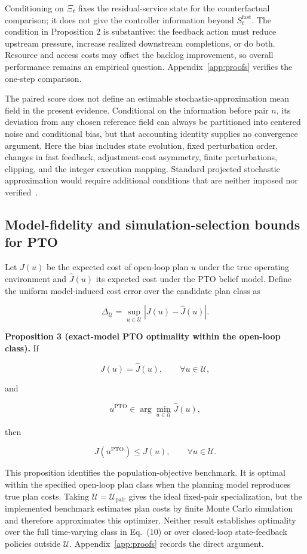 \documentclass[preprint,12pt,authoryear,a4paper]{elsarticle}
\begin{document}
Conditioning on \(\Xi_t\) fixes the residual-service state for the counterfactual comparison; it does not give the controller information beyond \(S_t^{\mathrm{fast}}\). The condition in Proposition 2 is substantive: the feedback action must reduce upstream pressure, increase realized downstream completions, or do both. Resource and access costs may offset the backlog improvement, so overall performance remains an empirical question. Appendix~\ref{app:proofs} verifies the one-step comparison.

The paired score does not define an estimable stochastic-approximation mean field in the present evidence. Conditional on the information before pair \(n\), its deviation from any chosen reference field can always be partitioned into centered noise and conditional bias, but that accounting identity supplies no convergence argument. Here the bias includes state evolution, fixed perturbation order, changes in fast feedback, adjustment-cost asymmetry, finite perturbations, clipping, and the integer execution mapping. Standard projected stochastic approximation would require additional conditions that are neither imposed nor verified~\citep{KushnerYin2003StochasticApproximation,Borkar2008StochasticApproximation}.

\subsection{Model-fidelity and simulation-selection bounds for PTO}
\label{subsec:5-3-model-fidelity-bounds-for-pto}

Let \(J(u)\) be the expected cost of open-loop plan \(u\) under the true operating environment and \(\widehat J(u)\) its expected cost under the PTO belief model. Define the uniform model-induced cost error over the candidate plan class as

\[
\Delta_{\mathcal U}
=\sup_{u\in\mathcal U}|J(u)-\widehat J(u)|.
\tag{26}
\]

\noindent\textbf{Proposition 3 (exact-model PTO optimality within the open-loop class).} If

\[
J(u)=\widehat J(u),
\qquad\forall u\in\mathcal U,
\]

and

\[
u^{\mathrm{PTO}}\in
\arg\min_{u\in\mathcal U}\widehat J(u),
\]

then

\[
J(u^{\mathrm{PTO}})\le J(u),
\qquad\forall u\in\mathcal U.
\tag{27}
\]

This proposition identifies the population-objective benchmark. It is optimal within the specified open-loop plan class when the planning model reproduces true plan costs. Taking \(\mathcal U=\mathcal U_{\mathrm{pair}}\) gives the ideal fixed-pair specialization, but the implemented benchmark estimates plan costs by finite Monte Carlo simulation and therefore approximates this optimizer. Neither result establishes optimality over the full time-varying class in Eq.~(10) or over closed-loop state-feedback policies outside \(\mathcal U\). Appendix~\ref{app:proofs} records the direct argument.
\end{document}
